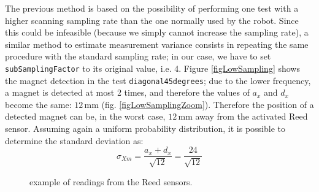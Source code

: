 The previous method is based on the possibility of performing one test with a higher scanning sampling rate than the one normally used by the robot. Since this could be infeasible (because we simply cannot increase the sampling rate), a similar method to estimate measurement variance consists in repeating the same procedure with the standard sampling rate; in our case, we have to set \texttt{subSamplingFactor} to its original value, i.e. 4. Figure \ref{figLowSampling} shows the magnet detection in the test \texttt{diagonal45degrees}; due to the lower frequency, a magnet is detected at most 2 times, and therefore the values of $a_x$ and $d_x$ become the same: $12\,\textrm{mm}$ (fig. \ref{figLowSamplingZoom}). Therefore the position of a detected magnet can be, in the worst case, $12\,\textrm{mm}$ away from the activated Reed sensor. Assuming again a uniform probability distribution, it is possible to determine the standard deviation as:
$$ \sigma_{Xm} = \frac{a_x+d_x}{\sqrt{12}} = \frac{24}{\sqrt{12}} $$

\begin{figure}[htbp]
	\centering
	\caption{example of readings from the Reed sensors.}
\end{figure}


